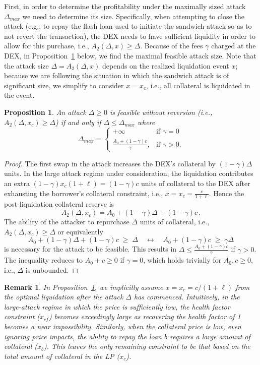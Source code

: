 \documentclass[11pt]{article} %
\newtheorem{proposition}[theorem]{Proposition}
\newtheorem{remark}{Remark}
\begin{document}
First, in order to determine the profitability under the maximally sized attack $\Delta_{max}$ we need to determine its size. Specifically, when attempting to close the attack (e.g., to repay the flash loan used to initiate the sandwich attack so as to not revert the transaction), the DEX needs to have sufficient liquidity in order to allow for this purchase, i.e., $A_2(\Delta,x) \geq \Delta$. Because of the fees $\gamma$ charged at the DEX, in Proposition~\ref{pr:delta_max} below, we find the maximal feasible attack size. Note that the attack size $\Delta = A_2(\Delta,x)$ depends on the realized liquidation event $x$; because we are following the situation in which the sandwich attack is of significant size, we simplify to consider $x = x_c$, i.e., all collateral is liquidated in the event.

\begin{proposition}\label{pr:delta_max}
An attack $\Delta \geq 0$ is feasible without reversion (i.e., $A_2(\Delta,x_c) \geq \Delta$) if and only if $\Delta \leq \Delta_{max}$ where
\[\Delta_{max} = \begin{cases} +\infty & \text{if } \gamma = 0 \\ \frac{A_0+(1-\gamma)c}{\gamma}, & \text{if } \gamma > 0. \end{cases}\]
\end{proposition}

\begin{proof}
The first swap in the attack increases the DEX's collateral by $(1-\gamma)\Delta$ units. In the large attack regime under consideration, the liquidation contributes an extra $(1-\gamma)x_c(1+\ell)=(1-\gamma)c$ units of collateral to the DEX after exhausting the borrower's collateral constraint, i.e., $x=x_c=\frac{c}{1+\ell}$. Hence the post-liquidation collateral reserve is $$A_2(\Delta,x_c)=A_0+(1-\gamma)\Delta+(1-\gamma)c\,.$$
The ability of the attacker to repurchase $\Delta$ units of collateral, i.e., $A_2(\Delta,x_c)\ge \Delta$ or equivalently
$$A_0+(1-\gamma)\Delta+(1-\gamma)c \;\ge\; \Delta \quad\leftrightarrow\quad A_0+(1-\gamma)c \;\ge\; \gamma \Delta
$$
is necessary for the attack to be feasible.
This results in $\Delta \le \frac{A_0+(1-\gamma)c}{\gamma}$ if $\gamma>0$. The inequality reduces to $A_0+c\ge 0$ if $\gamma=0$, which holds trivially for $A_0,c\ge 0$, i.e., $\Delta$ is unbounded.
\end{proof}

\begin{remark}
In Proposition~\ref{pr:delta_max}, we implicitly assume $x = x_c = c/(1+\ell)$ from the optimal liquidation after the attack $\Delta$ has commenced. Intuitively, in the large-attack regime in which the price is sufficiently low, the health factor constraint ($x_{cf}$) becomes exceedingly large as recovering the health factor of 1 becomes a near impossibility. Similarly, when the collateral price is low, even ignoring price impacts, the ability to repay the loan $b$ requires a large amount of collateral ($x_b$). This leaves the only remaining constraint to be that based on the total amount of collateral in the LP ($x_c$).
\end{remark}
\end{document}

